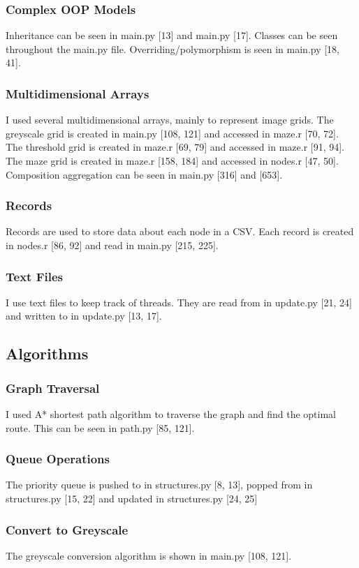 \documentclass[titlepage]{article}
\begin{document}
\subsubsection{Complex OOP Models}
Inheritance can be seen in main.py [13] and main.py [17]. Classes can be seen throughout the main.py file. Overriding/polymorphism is seen in main.py [18, 41]. 
\subsubsection{Multidimensional Arrays}
I used several multidimensional arrays, mainly to represent image grids. The greyscale grid is created in main.py [108, 121] and accessed in maze.r [70, 72]. The threshold grid is created in maze.r [69, 79] and accessed in maze.r [91, 94]. The maze grid is created in maze.r [158, 184] and accessed in nodes.r [47, 50]. Composition aggregation can be seen in main.py [316] and [653].
\subsubsection{Records}
Records are used to store data about each node in a CSV. Each record is created in nodes.r [86, 92] and read in main.py [215, 225].
\subsubsection{Text Files}
I use text files to keep track of threads. They are read from in update.py [21, 24] and written to in update.py [13, 17].


\subsection{Algorithms}
\subsubsection{Graph Traversal}
I used A* shortest path algorithm to traverse the graph and find the optimal route. This can be seen in path.py [85, 121].
\subsubsection{Queue Operations}
The priority queue is pushed to in structures.py [8, 13], popped from in structures.py [15, 22] and updated in structures.py [24, 25]
\subsubsection{Convert to Greyscale}
The greyscale conversion algorithm is shown in main.py [108, 121].
\end{document}
